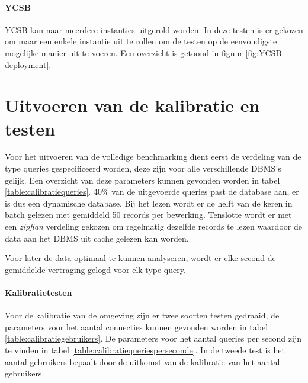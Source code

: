 \paragraph{YCSB} YCSB kan naar meerdere instanties uitgerold worden. In deze testen is er gekozen om maar een enkele instantie uit te rollen om de testen op de eenvoudigste mogelijke manier uit te voeren.  Een overzicht is getoond in figuur \ref{fig:YCSB-deployment}. 


\section{Uitvoeren van de kalibratie en testen}
Voor het uitvoeren van de volledige benchmarking dient eerst de verdeling van de type queries gespecificeerd worden, deze zijn voor alle verschillende DBMS's gelijk. Een overzicht van deze parameters kunnen gevonden worden in tabel \ref{table:calibratiequeries}. 40\% van de uitgevoerde queries past de database aan, er is dus een dynamische database. Bij het lezen wordt er de helft van de keren in batch gelezen met gemiddeld 50 records per bewerking. Tenslotte wordt er met een \textit{zipfian} verdeling gekozen om regelmatig dezelfde records te lezen waardoor de data aan het DBMS uit cache gelezen kan worden. 

Voor later de data optimaal te kunnen analyseren, wordt er elke second de gemiddelde vertraging gelogd voor elk type query. 

\paragraph{Kalibratietesten} Voor de kalibratie van de omgeving zijn er twee soorten testen gedraaid, de parameters voor het aantal connecties kunnen gevonden worden in tabel \ref{table:calibratiegebruikers}. De parameters voor het aantal queries per second zijn te vinden in tabel \ref{table:calibratiequeriesperseconde}. In de tweede test is het aantal gebruikers bepaalt door de uitkomst van de kalibratie van het aantal gebruikers. 

